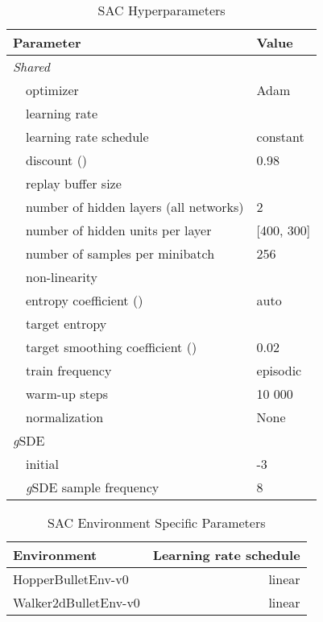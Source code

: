 \documentclass{article}
\newcommand{\ourSDE}{\textit{g}\textsc{SDE}\xspace}
\newcommand{\sac}{\textsc{SAC}\xspace}
\begin{document}
\begin{table}[h]
\renewcommand{\arraystretch}{1.1}
\centering
\caption{\sac Hyperparameters}
\label{tab:sac_shared_params}
\vspace{1mm}
  \begin{tabular}{@{}l l| l@{}}
    \toprule
    \multicolumn{2}{l|}{Parameter} &  Value\\
    \midrule
    \multicolumn{2}{l|}{\textit{Shared}}& \\
    & optimizer & Adam~\citep{kingma2014adam}\\
    & learning rate & \\
    & learning rate schedule & constant \\
    & discount () &  0.98\\
    & replay buffer size & \\
    & number of hidden layers (all networks) & 2\\
    & number of hidden units per layer & [400, 300]\\
    & number of samples per minibatch & 256\\
    & non-linearity & \\
    & entropy coefficient () & auto\\
    & target entropy & \\
    & target smoothing coefficient ()& 0.02\\
    & train frequency & episodic\\
    & warm-up steps & 10 000\\
    & normalization & None\\
    \midrule
    \multicolumn{2}{l|}{\ourSDE}& \\
    & initial  & -3\\
    & \ourSDE sample frequency & 8\\
    \bottomrule
  \end{tabular}
\end{table}

\begin{table}[h]
\renewcommand{\arraystretch}{1.1}
\centering
\caption{\sac Environment Specific Parameters}
\label{tab:sac_env_params}
\vspace{1mm}
  \begin{tabular}{@{}l r@{}}
    \toprule
    Environment 	& Learning rate schedule\\
    \midrule
    HopperBulletEnv-v0  & linear\\
    Walker2dBulletEnv-v0 & linear\\
    \bottomrule
  \end{tabular}
\end{table}
\end{document}
